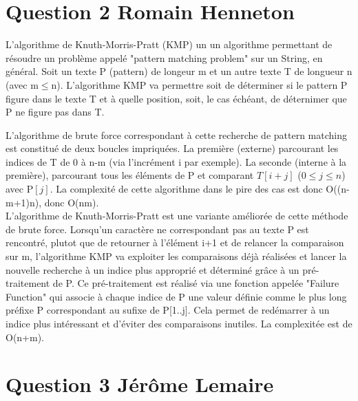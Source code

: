 \documentclass[10pt,a4paper]{article}
\begin{document}
\section*{Question 2 Romain Henneton}
L'algorithme de Knuth-Morris-Pratt (KMP) un un algorithme permettant de résoudre un problème appelé "pattern matching problem" sur un String, en général. Soit un texte P (pattern) de longeur m et un autre texte T de longueur n (avec m$\leq$n). L'algorithme KMP va permettre soit de déterminer si le pattern P figure dans le texte T et à quelle position, soit, le cas échéant, de déternimer que P ne figure pas dans T.



L'algorithme de brute force correspondant à cette recherche de pattern matching est constitué de deux boucles impriquées. La première (externe) parcourant les indices de T de 0 à n-m (via l'incrément i par exemple). La seconde (interne à la première), parcourant tous les éléments de P et comparant $T[i+j]$ ($0\leq j\leq n$) avec P$[j]$. La complexité de cette algorithme dans le pire des cas est donc O((n-m+1)n), donc O(nm).\\
L'algorithme de Knuth-Morris-Pratt est une variante améliorée de cette méthode de brute force. Lorsqu'un caractère ne correspondant pas au texte P est rencontré, plutot que de retourner à l'élément i+1 et de relancer la comparaison sur m, l'algorithme KMP va exploiter les comparaisons déjà réalisées et lancer la nouvelle recherche à un indice plus approprié et déterminé grâce à un pré-traitement de P. Ce pré-traitement est réalisé via une fonction appelée "Failure Function" qui associe à chaque indice de P une valeur définie comme le plus long préfixe P correspondant au sufixe de P[1..j]. Cela permet de redémarrer à un indice plus intéressant et d'éviter des comparaisons inutiles. La complexitée  est de O(n+m).
\section*{Question 3 Jérôme Lemaire}
\end{document}
